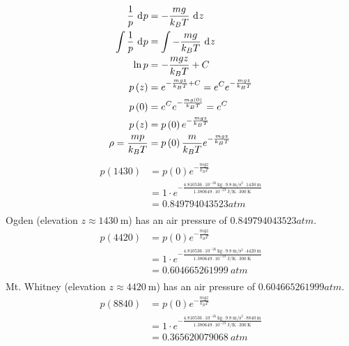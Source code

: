 \documentclass{article}
\begin{document}
\begin{equation}
    \begin{split}
        \frac{1}{p} \, \diff{p} & = -\frac{mg}{k_BT} \, \diff{z} \\
        \int \frac{1}{p} \, \diff{p} & = \int -\frac{mg}{k_B T} \, \diff{z} \\
        \ln{p} & = -\frac{mgz}{k_B T} + C \\
        p\left(z\right) & = e^{-\frac{mgz}{k_B T} + C} = e^C e^{-\frac{mgz}{k_B T}} \\
        p\left(0\right) & = e^C e^{-\frac{mg\left(0\right)}{k_B T}} = e^C \\
        p\left(z\right) & = p\left(0\right)e^{-\frac{mgz}{k_B T}} \\
        \rho = \frac{mp}{k_B T} & = p\left(0\right)\frac{m}{k_B T}e^{-\frac{mgz}{k_B T}}
    \end{split}
\end{equation}
\begin{equation}
    \begin{split}
        p(1430) & = p(0)e^{-\frac{mgz}{k_BT}} \\
        & = 1 \cdot e^{-\frac{4.810536 \cdot 10^{-26}~\unit{\kilo\gram} \cdot 9.8~\unit{\meter\per\second\squared} \cdot 1430~\unit{\meter}}{1.380649 \cdot 10^{-23}~\unit{\joule\per\kelvin} \cdot 300~\unit{\kelvin}}} \\
        & = 0.849794043523 \unit{atm} \\
    \end{split}
\end{equation}
Ogden (elevation $z \approx 1430~\unit{\meter}$) has an air pressure of $0.849794043523 \unit{atm}$.
\begin{equation}
    \begin{split}
        p(4420) & = p(0)e^{-\frac{mgz}{k_BT}} \\
        & = 1 \cdot e^{-\frac{4.810536 \cdot 10^{-26}~\unit{\kilo\gram} \cdot 9.8~\unit{\meter\per\second\squared} \cdot 4420~\unit{\meter}}{1.380649 \cdot 10^{-23}~\unit{\joule\per\kelvin} \cdot 300~\unit{\kelvin}}} \\
        & = 0.604665261999~\unit{atm} \\
    \end{split}
\end{equation}
Mt. Whitney (elevation $z \approx 4420~\unit{\meter}$) has an air pressure of $0.604665261999 \unit{atm}$.
\begin{equation}
    \begin{split}
        p(8840) & = p(0)e^{-\frac{mgz}{k_BT}} \\
        & = 1 \cdot e^{-\frac{4.810536 \cdot 10^{-26}~\unit{\kilo\gram} \cdot 9.8~\unit{\meter\per\second\squared} \cdot 8840~\unit{\meter}}{1.380649 \cdot 10^{-23}~\unit{\joule\per\kelvin} \cdot 300~\unit{\kelvin}}} \\
        & = 0.365620079068~\unit{atm} \\
    \end{split}
\end{equation}
\end{document}
